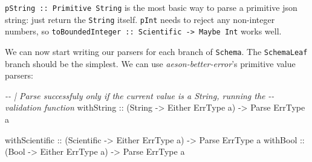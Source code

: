 \documentclass[]{article}
\newenvironment{Shaded}{}{}
\newcommand{\CommentTok}[1]{\textcolor[rgb]{0.38,0.63,0.69}{\textit{#1}}}
\newcommand{\DataTypeTok}[1]{\textcolor[rgb]{0.56,0.13,0.00}{#1}}
\newcommand{\FunctionTok}[1]{\textcolor[rgb]{0.02,0.16,0.49}{#1}}
\newcommand{\KeywordTok}[1]{\textcolor[rgb]{0.00,0.44,0.13}{\textbf{#1}}}
\newcommand{\NormalTok}[1]{#1}
\newcommand{\OperatorTok}[1]{\textcolor[rgb]{0.40,0.40,0.40}{#1}}
\newcommand{\OtherTok}[1]{\textcolor[rgb]{0.00,0.44,0.13}{#1}}
\newcommand{\StringTok}[1]{\textcolor[rgb]{0.25,0.44,0.63}{#1}}
\begin{document}
\texttt{pString\ ::\ Primitive\ String} is the most basic way to parse a
primitive json string: just return the \texttt{String} itself. \texttt{pInt}
needs to reject any non-integer numbers, so
\texttt{toBoundedInteger\ ::\ Scientific\ -\textgreater{}\ Maybe\ Int} works
well.

We can now start writing our parsers for each branch of \texttt{Schema}. The
\texttt{SchemaLeaf} branch should be the simplest. We can use
\emph{aeson-better-error}'s primitive value parsers:

\begin{Shaded}
\begin{Highlighting}[]
\CommentTok{{-}{-} | Parse successfuly only if the current value is a String, running the}
\CommentTok{{-}{-} validation function}
\OtherTok{withString     ::}\NormalTok{ (}\DataTypeTok{String}     \OtherTok{{-}>} \DataTypeTok{Either} \DataTypeTok{ErrType}\NormalTok{ a) }\OtherTok{{-}>} \DataTypeTok{Parse} \DataTypeTok{ErrType}\NormalTok{ a}

\OtherTok{withScientific ::}\NormalTok{ (}\DataTypeTok{Scientific} \OtherTok{{-}>} \DataTypeTok{Either} \DataTypeTok{ErrType}\NormalTok{ a) }\OtherTok{{-}>} \DataTypeTok{Parse} \DataTypeTok{ErrType}\NormalTok{ a}
\OtherTok{withBool       ::}\NormalTok{ (}\DataTypeTok{Bool}       \OtherTok{{-}>} \DataTypeTok{Either} \DataTypeTok{ErrType}\NormalTok{ a) }\OtherTok{{-}>} \DataTypeTok{Parse} \DataTypeTok{ErrType}\NormalTok{ a}
\end{Highlighting}
\end{Shaded}

\begin{Shaded}
\end{Shaded}
\end{document}
